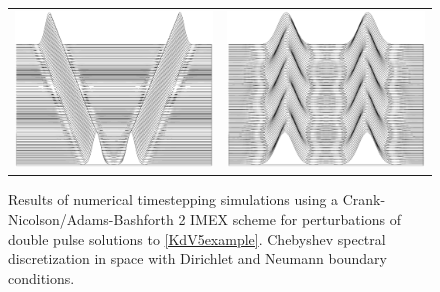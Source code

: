 \documentclass[10pt,reqno]{amsart}
\theoremstyle{plain}
\theoremstyle{definition}
\theoremstyle{remark}
\numberwithin{theorem}{section}
\numberwithin{equation}{section}
\begin{document}
\begin{figure}[H]
\begin{center}
\begin{tabular}{cc}
\includegraphics[width=8cm]{images/waterfallunstable.eps} &
\includegraphics[width=8cm]{images/waterfallstable.eps}
\end{tabular}
\end{center}
\caption{Results of numerical timestepping simulations using a Crank-Nicolson/Adams-Bashforth 2 IMEX scheme for perturbations of double pulse solutions to \cref{KdV5example}. Chebyshev spectral discretization in space with Dirichlet and Neumann boundary conditions.}
\label{fig:KdV5waterfall}
\end{figure}

\end{document}
